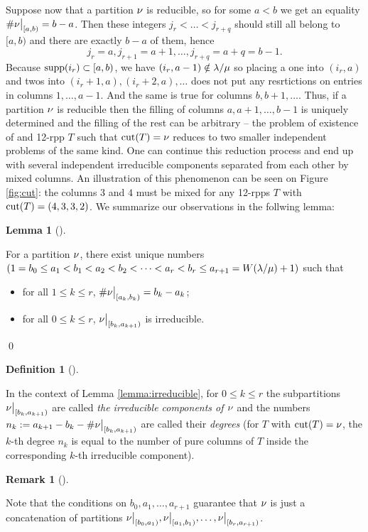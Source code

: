 \documentclass[numbers=enddot,12pt,final,onecolumn,notitlepage]{scrartcl}%
\theoremstyle{definition}
\newtheorem{lem}[theo]{Lemma}
\newenvironment{lemma}[1][]
{\begin{lem}[#1]\begin{leftbar}}
{\end{leftbar}\end{lem}}
\newtheorem{defi}[theo]{Definition}
\newenvironment{definition}[1][]
{\begin{defi}[#1]\begin{leftbar}}
{\end{leftbar}\end{defi}}
\newtheorem{remk}[theo]{Remark}
\newenvironment{remark}[1][]
{\begin{remk}[#1]\begin{leftbar}}
{\end{leftbar}\end{remk}}
\begin{document}
Suppose now that a partition ${{\nu}}$ is reducible, so for some $a<b$ we get an equality $\#{{{\nu}}\big|_{[a,b)}}=b-a$. Then these integers $j_r<\dots<j_{r+q}$ should still all belong to $[a,b)$ and there are exactly $b-a$ of them, hence 
$$j_r=a,j_{r+1}=a+1,\dots,j_{r+q}=a+q=b-1.$$
Because ${\operatorname*{supp}}(i_r)\subset[a,b)$, we have $(i_r,a-1)\notin{\lambda/\mu}$ so placing a one into $(i_r,a)$ and twos into $(i_r+1,a),(i_r+2,a),\dots$ does not put any resrtictions on entries in columns $1,\dots, a-1$. And the same is true for columns $b,b+1,\dots$. Thus, if a partition ${{\nu}}$ is reducible then the filling of columns $a,a+1,\dots, b-1$ is uniquely determined and the filling of the rest can be arbitrary -- the problem of existence of and 12-rpp $T$ such that ${\operatorname*{cut}}(T)={{\nu}}$ reduces to two smaller independent problems of the same kind. One can continue this reduction process and end up with several independent irreducible components separated from each other by mixed columns. An illustration of this phenomenon can be seen on Figure \ref{fig:cut}: the columns $3$ and $4$ must be mixed for any 12-rpps $T$ with ${\operatorname*{cut}}(T)=(4,3,3,2)$. We summarize our observations in the follwing lemma:
\begin{lemma}
\label{lemma:irreducible}
 For a partition ${{\nu}}$, there exist unique numbers $(1=b_0\leq a_1<b_1<a_2<b_2<\dots<a_r<b_r\leq a_{r+1}=W({\lambda/\mu})+1)$ such that 
 \begin{itemize}
  \item for all $1\leq k\leq r$, $\#{{{\nu}}\big|_{[a_k,b_k)}} =b_k-a_k$;
  \item for all $0\leq k \leq r$, ${{{\nu}}\big|_{[b_k,a_{k+1})}}$ is irreducible.
 \end{itemize}
\end{lemma}\qed
\begin{definition}
 In the context of Lemma \ref{lemma:irreducible}, for $0\leq k\leq r$ the subpartitions ${{{\nu}}\big|_{[b_k,a_{k+1})}}$ are called \textit{the irreducible components of ${{\nu}}$} and the numbers $n_k:=a_{k+1}-b_k-\#{{{\nu}}\big|_{[b_k,a_{k+1})}}$ are called their \textit{degrees}  (for $T$ with ${\operatorname*{cut}}(T)={{\nu}}$, the $k$-th degree $n_k$ is equal to the number of pure columns of $T$ inside the corresponding $k$-th irreducible component).
\end{definition}
\begin{remark}
 Note that the conditions on $b_0,a_1,\dots,a_{r+1}$ guarantee that ${{\nu}}$ is just a concatenation of partitions ${{{\nu}}\big|_{[b_0,a_1)}},{{{\nu}}\big|_{[a_1,b_1)}},\dots,{{{\nu}}\big|_{[b_r,a_{r+1})}}$. 
\end{remark}
\end{document}
